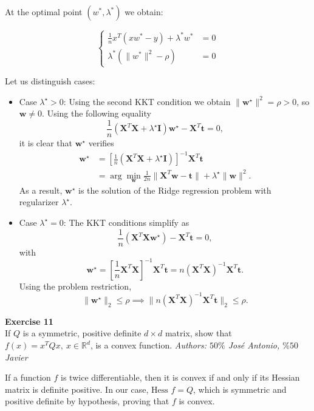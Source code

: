 \documentclass[11pt,table]{article}
\newenvironment{problem}[2][Exercise]
{ \begin{mdframed}[backgroundcolor=gray!20] \textbf{#1 #2} \\}
	{\hspace{0.0cm}\newline\newline \emph{Authors: \(50\%\) José Antonio, \(\%50\) Javier}  \end{mdframed}}
\begin{document}
At the optimal point $(w^*, \lambda^*)$ we obtain:

\begin{equation}
	\label{eq10}
	\begin{cases}
		\frac{1}{n}x^T(xw^* - y) + \lambda^* w^*                & = 0 \\
		\lambda^* \left(\parallel w^* \parallel^2 - \rho\right) & = 0
	\end{cases}
\end{equation}

Let us distinguish cases:

\begin{itemize}
	\item Case $\lambda^\star > 0$: Using the second KKT condition we obtain \(\|\bm{w}^\star\|^2 = \rho > 0\), so \(\bm{w} \neq 0\).
	      Using the following equality
	      \[
		      \frac{1}{n} (\bm{X}^T \bm{X} + \lambda^\star \bm{I})\bm{w}^\star - \bm{X}^T\bm{t} = 0,
	      \]
	      it is clear that \(\bm{w}^\star\) verifies
	      \[\begin{aligned}
			      \bm{w}^\star & = \left[ \frac{1}{n} (\bm{X}^T \bm{X} + \lambda^\star \bm{I})\right]^{-1}\bm{X}^T \bm{t}     \\
			                   & = \arg \min_{\bm{w}} \frac{1}{2n} \|\bm{X}^T \bm{w} - \bm{t}\| + \lambda^\star \|\bm{w}\|^2.
		      \end{aligned}\]
	      As a result, \(\bm{w}^\star\) is the solution of the Ridge regression problem with regularizer \(\lambda^\star\).
	\item Case \(\lambda^\star = 0\): The KKT conditions simplify as
	      \[
		      \frac{1}{n} \left(\bm{X}^T \bm{X}\bm{w}^\star\right) - \bm{X}^T\bm{t} = 0,
	      \]
	      with
	      \[
		      \bm{w}^\star = \left[ \frac{1}{n} \bm{X}^T \bm{X}\right]^{-1}\bm{X}^T \bm{t} = n(\bm X^T\bm X)^{-1} \bm X^T\bm{t}.
	      \]
	      Using the problem restriction,
	      \[
		      \|\bm{w}^\star\|_2 \leq \rho \implies \| n(\bm X^T\bm X)^{-1} \bm X^T\bm{t} \|_2 \leq \rho.
	      \]
\end{itemize}



\begin{problem}{11}
If \( Q \) is a symmetric, positive definite \( d \times d \) matrix, show that \( f(x) = x^TQx, \ x \in \mathbb{R}^d \), is a convex function.
\end{problem}

If a function $f$ is twice differentiable, then it is convex if and only if its Hessian matrix is definite positive. In our case, $\text{Hess }f = Q$, which is symmetric and positive definite by hypothesis, proving that $f$ is convex. \\
\end{document}
